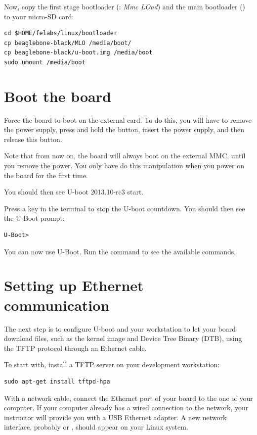 Now, copy the first stage bootloader (: {\em Mmc LOad}) and the main
bootloader () to your micro-SD card:

\begin{verbatim}
cd $HOME/felabs/linux/bootloader
cp beaglebone-black/MLO /media/boot/
cp beaglebone-black/u-boot.img /media/boot
sudo umount /media/boot
\end{verbatim}

\section{Boot the board}

Force the board to boot on the external card. To do this, you will
have to remove the power supply, press and hold the 
button, insert the power supply, and then release this button.

Note that from now on, the board will always boot on the external 
MMC, until you remove the power. You only have do this manipulation
when you power on the board for the first time.

You should then see U-boot 2013.10-rc3 start.

Press a key in the  terminal to stop the U-boot
countdown. You should then see the U-Boot prompt:
\begin{verbatim}
U-Boot>
\end{verbatim}

You can now use U-Boot. Run the  command to see the available
commands.

\section{Setting up Ethernet communication}

The next step is to configure U-boot and your workstation to let your
board download files, such as the kernel image and Device Tree Binary
(DTB), using the TFTP protocol through an Ethernet cable.

To start with, install a TFTP server on your development workstation:

\begin{verbatim}
sudo apt-get install tftpd-hpa
\end{verbatim}

With a network cable, connect the Ethernet port of your board to the
one of your computer. If your computer already has a wired connection
to the network, your instructor will provide you with a USB Ethernet
adapter. A new network interface, probably  or ,
should appear on your Linux system.

